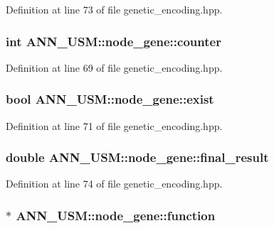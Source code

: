 Definition at line 73 of file genetic\-\_\-encoding.\-hpp.

\hypertarget{class_a_n_n___u_s_m_1_1node__gene_a38eb3708558a74ce2ce8aac04c8511b8}{
\subsubsection[{counter}]{\setlength{\rightskip}{0pt plus 5cm}int A\-N\-N\-\_\-\-U\-S\-M\-::node\-\_\-gene\-::counter}}\label{class_a_n_n___u_s_m_1_1node__gene_a38eb3708558a74ce2ce8aac04c8511b8}


Definition at line 69 of file genetic\-\_\-encoding.\-hpp.

\hypertarget{class_a_n_n___u_s_m_1_1node__gene_a128ec887fd61121228a404b6c48f70ed}{
\subsubsection[{exist}]{\setlength{\rightskip}{0pt plus 5cm}bool A\-N\-N\-\_\-\-U\-S\-M\-::node\-\_\-gene\-::exist}}\label{class_a_n_n___u_s_m_1_1node__gene_a128ec887fd61121228a404b6c48f70ed}


Definition at line 71 of file genetic\-\_\-encoding.\-hpp.

\hypertarget{class_a_n_n___u_s_m_1_1node__gene_ab5311006a4d63b4eeed4b115d87c829a}{
\subsubsection[{final\-\_\-result}]{\setlength{\rightskip}{0pt plus 5cm}double A\-N\-N\-\_\-\-U\-S\-M\-::node\-\_\-gene\-::final\-\_\-result}}\label{class_a_n_n___u_s_m_1_1node__gene_ab5311006a4d63b4eeed4b115d87c829a}


Definition at line 74 of file genetic\-\_\-encoding.\-hpp.

\hypertarget{class_a_n_n___u_s_m_1_1node__gene_a3191d2de9879934a6cd1331b2ffa68b8}{
\subsubsection[{function}]{$\ast$ A\-N\-N\-\_\-\-U\-S\-M\-::node\-\_\-gene\-::function}}\label{class_a_n_n___u_s_m_1_1node__gene_a3191d2de9879934a6cd1331b2ffa68b8}


